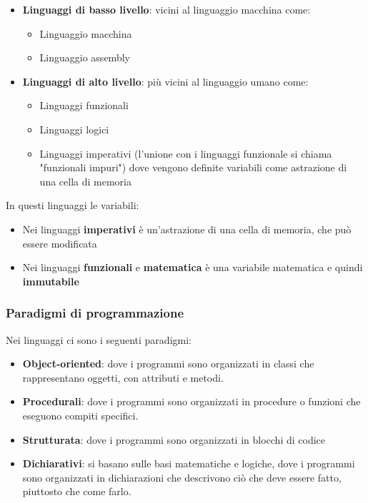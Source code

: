 \documentclass[a4paper]{article}
\begin{document}
\begin{itemize}
    \item \textbf{Linguaggi di basso livello}: vicini al linguaggio macchina come:
    \begin{itemize}
        \item Linguaggio macchina
        \item Linguaggio assembly
    \end{itemize}
    \item \textbf{Linguaggi di alto livello}: più vicini al linguaggio umano come:
    \begin{itemize}
        \item Linguaggi funzionali 
        \item Linguaggi logici
        \item Linguaggi imperativi (l'unione con i linguaggi funzionale si chiama "funzionali impuri")
        dove vengono definite variabili come astrazione di una cella di memoria
    \end{itemize}
\end{itemize}
In questi linguaggi le variabili:
\begin{itemize}
    \item Nei linguaggi \textbf{imperativi} è un'astrazione di una cella di memoria, che può essere modificata
    \item Nei linguaggi \textbf{funzionali} e \textbf{matematica} 
    è una variabile matematica e quindi \textbf{immutabile}
\end{itemize}

\subsubsection{Paradigmi di programmazione}

Nei linguaggi ci sono i seguenti paradigmi:
\begin{itemize}
    \item \textbf{Object-oriented}: dove i programmi sono organizzati in classi 
    che rappresentano oggetti, con attributi e metodi.
    \item \textbf{Procedurali}: dove i programmi sono organizzati in procedure 
    o funzioni che eseguono compiti specifici. 
    \item \textbf{Strutturata}: dove i programmi sono organizzati in blocchi di codice
    \item \textbf{Dichiarativi}: si basano sulle basi matematiche e logiche, dove i programmi sono organizzati 
    in dichiarazioni che descrivono ciò che deve essere fatto, piuttosto che come farlo.
\end{itemize}
\end{document}
